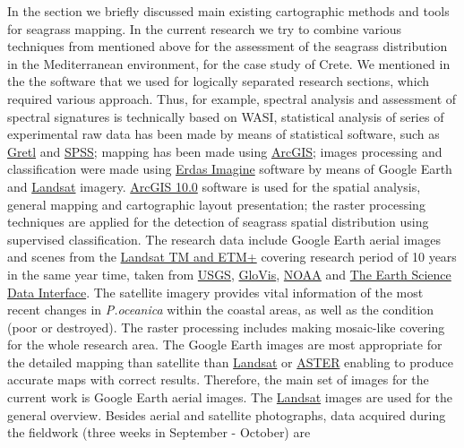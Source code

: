 \documentclass[10pt, a4paper]{article}
\begin{document}
In the section  we briefly discussed main existing cartographic methods and tools for seagrass mapping. In the current  research we try to combine various techniques from mentioned above for the assessment of the seagrass distribution in the Mediterranean environment, for the case study of Crete. We mentioned in the  the software that we used for logically separated research sections, which required various approach. Thus, for example,  spectral analysis and assessment of spectral signatures is technically based on WASI, statistical analysis of series of experimental raw data has been made by means of statistical software, such as \href{http://gretl.sourceforge.net/}{Gretl} and \href{http://www.spss.com/}{SPSS}; mapping has been made using  \href{http://www.esri.com/software/arcgis/index.html}{ArcGIS}; images processing and classification were made using \href{http://www.erdas.com/products/ERDASIMAGINE/ERDASIMAGINE/Details.aspx}{Erdas Imagine} software by means of Google Earth and  \href{http://landsat.gsfc.nasa.gov/}{Landsat} imagery.
\href{http://www.esri.com/software/arcgis/index.html}{ArcGIS 10.0} software is used for the spatial analysis, general mapping and cartographic layout
presentation; the raster processing techniques are applied for the detection of seagrass spatial
distribution using supervised classification.
The research data include Google Earth aerial images and scenes from the \href{http://landsat.gsfc.nasa.gov/}{Landsat TM and ETM+}
covering research period of 10 years in the same year time, taken from \href{http://www.usgs.gov/pubprod/}{USGS}, \href{http://glovis.usgs.gov/}{GloVis}, \href{http://www.osdpd.noaa.gov/ml/index.html}{NOAA} and \href{http://glcfapp.glcf.umd.edu:8080/esdi/index.jsp}{The Earth Science Data Interface}. 
The satellite imagery provides
vital information of the most recent changes in \textit{P.oceanica} within the coastal areas, as well as the
condition (poor or destroyed).
The raster processing includes making mosaic-like covering for the whole research area. The Google
Earth images are most appropriate for the detailed mapping than satellite than \href{http://landsat.gsfc.nasa.gov/}{Landsat} or \href{http://asterweb.jpl.nasa.gov/}{ASTER} enabling to produce accurate maps with correct results. Therefore, the main set of images for the
current work is Google Earth aerial images. The  \href{http://landsat.gsfc.nasa.gov/}{Landsat} images are used for the general overview.
Besides aerial and satellite photographs, data acquired during the fieldwork (three weeks in September - October) are
\end{document}
